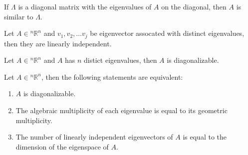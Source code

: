 \documentclass[11pt]{report}
\begin{document}
\begin{theorem}
    If $\Lambda$ is a diagonal matrix with the eigenvalues of $A$ on the diagonal, then $A$ is similar to $\Lambda$.
\end{theorem}
\begin{lemma}
    Let $A \in {^n\mathbb{R}^n}$ and $v_1, v_2, \dots v_j$ be eigenvector assocated with distinct eigenvalues, then they are linearly independent.
\end{lemma}
\begin{theorem}
    Let $A \in {^n\mathbb{R}^n}$ and $A$ has $n$ distict eigenvalues, then $A$ is diagonalizable.
\end{theorem}
\begin{theorem}
    Let $A \in {^n\mathbb{R}^n}$, then the following statements are equivalent:
    \begin{enumerate}
        \item $A$ is diagonalizable.
        \item The algebraic multiplicity of each eigenvalue is equal to its geometric multiplicity.
        \item The number of linearly independent eigenvectors of $A$ is equal to the dimension of the eigenspace of $A$.
    \end{enumerate}
\end{theorem}
\end{document}
